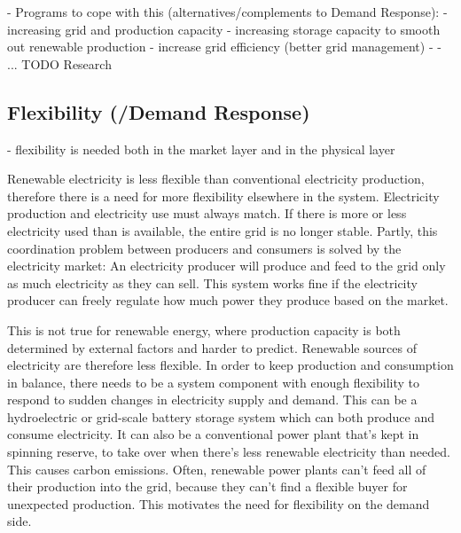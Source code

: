 - Programs to cope with this (alternatives/complements to Demand Response):
    - increasing grid and production capacity
    - increasing storage capacity to smooth out renewable production
    - increase grid efficiency (better grid management)
    - 
    - ... TODO Research

\subsection{Flexibility (/Demand Response)}


- flexibility is needed both in the market layer and in the physical layer

Renewable electricity is less flexible than conventional electricity production, therefore there is a need for more flexibility elsewhere in the system.
Electricity production and electricity use must always match. If there is more or less electricity used than is available, the entire grid is no longer stable.
Partly, this coordination problem between producers and consumers is solved by the electricity market:
An electricity producer will produce and feed to the grid only as much electricity as they can sell.
This system works fine if the electricity producer can freely regulate how much power they produce based on the market.

This is not true for renewable energy, where production capacity is both determined by external factors and harder to predict.
Renewable sources of electricity are therefore less flexible.
In order to keep production and consumption in balance, there needs to be a system component with enough flexibility to respond to sudden changes in electricity supply and demand.
This can be a hydroelectric or grid-scale battery storage system which can both produce and consume electricity.
It can also be a conventional power plant that's kept in spinning reserve, to take over when there's less renewable electricity than needed. This causes carbon emissions.
Often, renewable power plants can't feed all of their production into the grid, because they can't find a flexible buyer for unexpected production.
This motivates the need for flexibility on the demand side.



